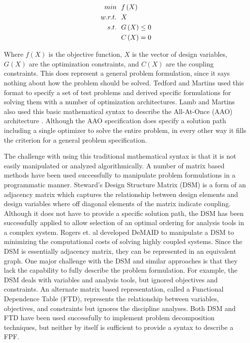 \documentclass[]{aiaa-tc} %
\begin{document}
    \begin{align}
        min &\ \ f\left(X\right) \notag
        \\ w.r.t. &\ \  X \notag
        \\ s.t. &\ \ G\left(X\right) \leq 0
        \\      &\ \ C\left(X\right) = 0
    \end{align}

    Where $f(X)$ is the objective function, $X$ is the vector of design variables, $G(X)$ are the optimization constraints, 
    and $C(X)$ are the coupling constraints. This does represent a general problem formulation, since it says nothing about 
    how the problem should be solved. Tedford and Martins used this format to specify a set of test problems and derived specific formulations 
    for solving them with a number of optimization architectures\cite{Tedford2009}. Lamb and Martins also used this basic mathematical 
    syntax to describe the All-At-Once (AAO) architecture \cite{Lambe2011}. Although the AAO specification does specify a solution path 
    including a single optimizer to solve the entire problem, in every other way it fills the criterion for a general problem specification. 

    The challenge with using this traditional mathematical syntax is that it is not easily manipulated or analyzed algorithmically. 
    A number of matrix based methods have been used successfully to manipulate problem formulations in a programmatic manner. Steward's 
    Design Structure Matrix (DSM) is a form of an adjacency matrix which captures the relationship between design elements and 
    design variables where off diagonal elements of the matrix indicate coupling\cite{Steward1981}. 
    Although it does not have to provide a specific solution path, the DSM has been successfully 
    applied to allow selection of an optimal ordering for analysis tools in a complex system. Rogers et. al developed DeMAID to manipulate a
    DSM to minimizing the computational costs of solving highly coupled systems\cite{Rogers1996}. 
    Since the DSM is essentially adjacency matrix, they can be represented in an equivalent graph. One major challenge with the DSM and similar 
    approaches is that they lack the capability to fully describe the problem formulation. For example, the DSM deals with variables and analysis tools, 
    but ignored objectives and constraints. An alternate matrix based representation, called a Functional Dependence Table (FTD), represents the relationship
    between variables, objectives, and constraints but ignores the discipline analyses\cite{Michelena1997}. Both DSM and FTD have been used 
    successfully to implement problem decomposition techniques, but neither by itself is sufficient to provide a syntax to describe a FPF. 
\end{document}
